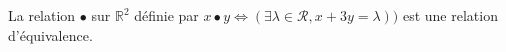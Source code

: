 La relation $\bullet$ sur $\mathbb R^2$ définie par $x\bullet y \iff (\exists \lambda\in\mathcal R, x+3y=\lambda))$ est une relation d'équivalence.

\begin{reponses}
\end{reponses}

